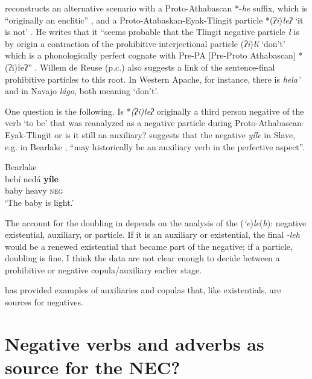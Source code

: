 \documentclass[output=paper,draft,draftmode,colorlinks,citecolor=brown]{langscibook}
\begin{document}
%
\citeauthor{Leer2000} reconstructs an alternative scenario with a
Proto-Athabascan *-\textit{he} suffix, which is ``originally an enclitic''
\citeyearpar[102]{Leer2000}, and a Proto-Atabaskan-Eyak-Tlingit particle
*(\textit{ʔi})\textit{łeʔ} `it is not' \citep[123]{Leer2000}. He writes that it
``seems probable that the Tlingit negative particle \textit{ł}
is by origin a contraction of the prohibitive interjectional particle
(\textit{ʔi})\textit{łí} `don't' which is a phonologically perfect cognate with
Pre-PA [Pre-Proto Athabascan] *(ʔi)łeʔ'' \citep[123--4]{Leer2000}. Willem
de Reuse (p.c.) also suggests a link of the sentence-final prohibitive
particles to this root. In Western Apache, for instance, there
is \textit{hela'} and in Navajo \textit{lágo}, both meaning `don't'.

One question is the following. Is *\textit{(ʔi)łeʔ} originally a third person
negative of the verb `to be' that was reanalyzed as a negative particle
during Proto-Atha\-bas\-can-Eyak-Tlingit or is it still an auxiliary? \citet[1108, n. 1]{Rice1989} suggests that the negative \textit{yíle} in Slave, e.g.
in Bearlake , ``may historically be an auxiliary verb in the
perfective aspect''.
%
\begin{exe}\ex Bearlake \label{ex:other-bearlake-light}\\
    \gll bebí  nedá  \textbf{yíle}            \\
    baby  heavy  \textsc{neg} \\
    \glt `The baby is light.' \citep[1101]{Rice1989}
    \end{exe}
%
The account for the doubling in  depends on the
analysis of the (\textit{‘e})\textit{le}(\textit{h}): negative existential, auxiliary, or
particle. If it is an auxiliary or existential, the final \textit{-leh}
would be a renewed existential that became part of the negative; if a
particle, doubling is fine. I think the data are not clear enough to decide
between a prohibitive or negative copula\slash auxiliary earlier stage.

 has provided examples of auxiliaries and copulas
that, like existentials, are sources for negatives.

\section{Negative verbs and adverbs as source for the
NEC?}\label{sec:oth-3}
\end{document}
